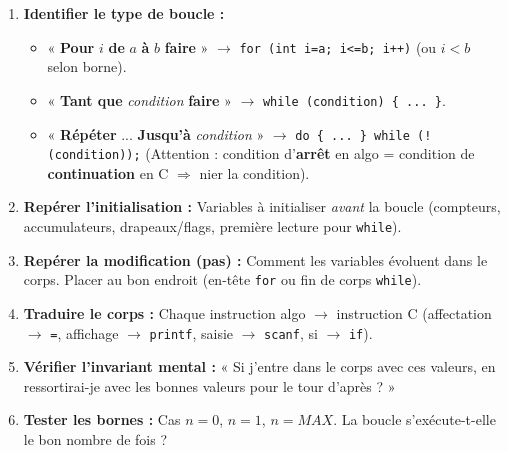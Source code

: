 \documentclass[11pt]{article}
\begin{document}
\begin{methode}
\begin{enumerate}
    \item \textbf{Identifier le type de boucle :}
    \begin{itemize}
        \item « \textbf{Pour} $i$ \textbf{de} $a$ \textbf{à} $b$ \textbf{faire} » $\rightarrow$ \texttt{for (int i=a; i<=b; i++)} (ou $i<b$ selon borne).
        \item « \textbf{Tant que} \textit{condition} \textbf{faire} » $\rightarrow$ \texttt{while (condition) \{ ... \}}.
        \item « \textbf{Répéter} ... \textbf{Jusqu'à} \textit{condition} » $\rightarrow$ \texttt{do \{ ... \} while (!(condition));} (Attention : condition d'\textbf{arrêt} en algo = condition de \textbf{continuation} en C $\Rightarrow$ nier la condition).
    \end{itemize}
    \item \textbf{Repérer l'initialisation :} Variables à initialiser \emph{avant} la boucle (compteurs, accumulateurs, drapeaux/flags, première lecture pour \texttt{while}).
    \item \textbf{Repérer la modification (pas) :} Comment les variables évoluent dans le corps. Placer au bon endroit (en-tête \texttt{for} ou fin de corps \texttt{while}).
    \item \textbf{Traduire le corps :} Chaque instruction algo $\rightarrow$ instruction C (affectation $\rightarrow$ \texttt{=}, affichage $\rightarrow$ \texttt{printf}, saisie $\rightarrow$ \texttt{scanf}, si $\rightarrow$ \texttt{if}).
    \item \textbf{Vérifier l'invariant mental :} « Si j'entre dans le corps avec ces valeurs, en ressortirai-je avec les bonnes valeurs pour le tour d'après ? »
    \item \textbf{Tester les bornes :} Cas $n=0$, $n=1$, $n=MAX$. La boucle s'exécute-t-elle le bon nombre de fois ?
\end{enumerate}
\end{methode}
\end{document}
